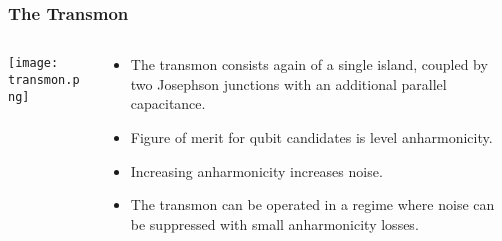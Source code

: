 \documentclass{beamer}
\begin{document}
\begin{frame}

    \frametitle{The Transmon}

    \begin{columns}[c]

    \begin{column}{0.4\linewidth}

            \begin{block}{}
                \vspace{-0.5cm}
    \texttt{[image: transmon.png]}
            \end{block}

    \end{column}

    \begin{column}{0.6\linewidth}
    
        \begin{itemize}
            
            \item The transmon consists again of a single island, 
                    coupled by two Josephson junctions with an
                    additional parallel capacitance. 
            \item Figure of merit for qubit candidates is level 
                    anharmonicity. 
            \item Increasing anharmonicity increases noise.
            \item The transmon can be operated in a regime where noise 
                    can be suppressed with small anharmonicity losses. 
                    
        \end{itemize}

    \end{column}

    \end{columns}

\end{frame}
\end{document}
